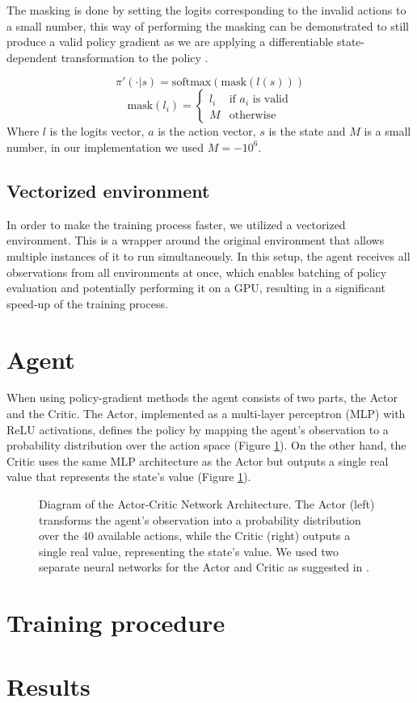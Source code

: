 The masking is done by setting the logits corresponding to the invalid actions to a small number, this way of performing the masking can be demonstrated to still produce a valid policy gradient as we are applying a differentiable state-dependent transformation to the policy \cite{action-masking}.

\begin{equation*}
    \pi'(\cdot|s) = \mathrm{softmax}(\mathrm{mask}(l(s)))
\end{equation*}
\begin{equation*}
    \mathrm{mask}(l_{i}) = \begin{cases}
        l_i & \text{if $a_i$ is valid} \\
        M & \text{otherwise}
    \end{cases}
\end{equation*}
Where $l$ is the logits vector, $a$ is the action vector, $s$ is the state and $M$ is a small number, in our implementation we used $M=-10^6$.

\subsection{Vectorized environment}
In order to make the training process faster, we utilized a vectorized environment. This is a wrapper around the original environment that allows multiple instances of it to run simultaneously. In this setup, the agent receives all observations from all environments at once, which enables batching of policy evaluation and potentially performing it on a GPU, resulting in a significant speed-up of the training process.

\section{Agent}
When using policy-gradient methods the agent consists of two parts, the Actor and the Critic. The Actor, implemented as a multi-layer perceptron (MLP) with ReLU activations, defines the policy by mapping the agent's observation to a probability distribution over the action space (Figure \ref{fig:actor-critic-network}). On the other hand, the Critic uses the same MLP architecture as the Actor but outputs a single real value that represents the state's value (Figure \ref{fig:actor-critic-network}).

\begin{figure}[H]
    \centering
    
    \caption{Diagram of the Actor-Critic Network Architecture. The Actor (left) transforms the agent's observation into a probability distribution over the 40 available actions, while the Critic (right) outputs a single real value, representing the state's value. We used two separate neural networks for the Actor and Critic as suggested in \cite{ppo-implementation-details}.}
    \label{fig:actor-critic-network}
\end{figure}


\section{Training procedure}

\section{Results}